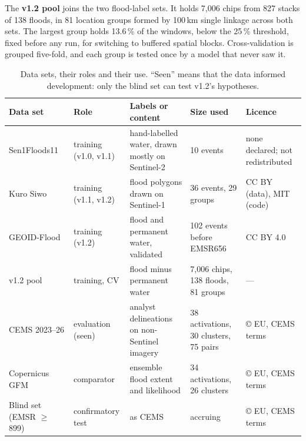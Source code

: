 \documentclass[10pt,twocolumn,a4paper]{article}
\newcommand{\pp}{\,\%}
\begin{document}
The \textbf{v1.2 pool} joins the two flood-label sets. It holds 7,006 chips from 827 stacks of 138 floods, in 81
location groups formed by 100\,km single linkage across both sets. The largest group holds 13.6\pp{} of the windows,
below the 25\pp{} threshold, fixed before any run, for switching to buffered spatial blocks. Cross-validation is
grouped five-fold, and each group is tested once by a model that never saw it.

\begin{table}[t]
\centering\small
\caption{Data sets, their roles and their use. ``Seen'' means that the data informed development: only the blind set
can test v1.2's hypotheses.}
\label{tab:data}
\begin{tabularx}{\textwidth}{@{}l l X p{3.9cm} p{3.2cm}@{}}
\toprule
Data set & Role & Labels or content & Size used & Licence \\
\midrule
Sen1Floods11~\citep{bonafilia2020sen1floods11} & training (v1.0, v1.1) & hand-labelled water, drawn mostly on Sentinel-2
  & 10 events & none declared; not redistributed \\
Kuro Siwo~\citep{bountos2024kurosiwo} & training (v1.1, v1.2) & flood polygons drawn on Sentinel-1
  & 36 events, 29 groups & CC BY (data), MIT (code) \\
GEOID-Flood~\citep{chiriaco2026geoid} & training (v1.2) & flood and permanent water, validated
  & 102 events before EMSR656 & CC BY 4.0 \\
v1.2 pool & training, CV & flood minus permanent water & 7,006 chips, 138 floods, 81 groups & --- \\
CEMS 2023--26 & evaluation (seen) & analyst delineations on non-Sentinel imagery
  & 38 activations, 30 clusters, 75 pairs & \copyright{} EU, CEMS terms \\
Copernicus GFM & comparator & ensemble flood extent and likelihood & 34 activations, 26 clusters
  & \copyright{} EU, CEMS terms \\
Blind set (EMSR $\geq$ 899) & confirmatory test & as CEMS & accruing & \copyright{} EU, CEMS terms \\
\bottomrule
\end{tabularx}
\end{table}
\end{document}
